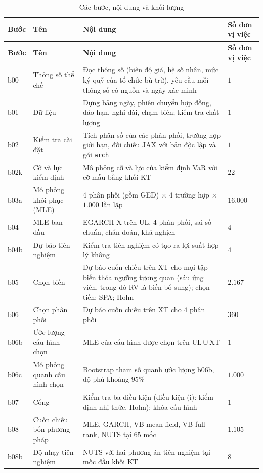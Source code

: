 \documentclass[12pt,a4paper]{article}
\theoremstyle{remark}
\newcommand{\ma}[1]{\texttt{\small #1}}
\newcommand{\UL}{\mathrm{UL}}
\newcommand{\XT}{\mathrm{XT}}
\newcommand{\KT}{\mathrm{KT}}
\begin{document}
\begin{longtable}{@{}p{1.2cm}p{4.1cm}p{5.6cm}p{3.2cm}@{}}
\caption{Các bước, nội dung và khối lượng}\label{tab:buoc}\\
\toprule
\textbf{Bước} & \textbf{Tên} & \textbf{Nội dung} & \textbf{Số đơn vị việc} \\
\midrule
\endfirsthead
\toprule
\textbf{Bước} & \textbf{Tên} & \textbf{Nội dung} & \textbf{Số đơn vị việc} \\
\midrule
\endhead
\bottomrule
\endfoot
b00 & Thông số thể chế & Đọc thông số (biên độ giá, hệ số nhân, mức ký quỹ của tổ chức bù trừ), yêu cầu mỗi thông số có nguồn và ngày xác minh & $1$ \\
b01 & Dữ liệu & Dựng bảng ngày, phiên chuyển hợp đồng, đáo hạn, nghỉ dài, chạm biên; kiểm tra chất lượng & $1$ \\
b02 & Kiểm tra cài đặt & Tích phân số của các phân phối, trường hợp giới hạn, đối chiếu JAX với bản độc lập và gói \ma{arch} & $1$ \\
b02k & Cỡ và lực kiểm định & Mô phỏng cỡ và lực của kiểm định VaR với cỡ mẫu bằng khối $\KT$ & $22$ \\
b03a & Mô phỏng khôi phục (MLE) & $4$ phân phối (gồm GED) $\times$ $4$ trường hợp $\times$ $1.000$ lần lặp & $16.000$ \\
b04 & MLE ban đầu & EGARCH-X trên $\UL$, $4$ phân phối, sai số chuẩn, chẩn đoán, khả nghịch & $4$ \\
b04b & Dự báo tiên nghiệm & Kiểm tra tiên nghiệm có tạo ra lợi suất hợp lý không & $4$ \\
b05 & Chọn biến & Dự báo cuốn chiếu trên $\XT$ cho mọi tập biến thỏa ngưỡng tương quan (sáu ứng viên, trong đó RV là biến bổ sung); chọn tiến; SPA; Holm & $2.167$ \\
b06 & Chọn phân phối & Dự báo cuốn chiếu trên $\XT$ cho $4$ phân phối & $360$ \\
b06b & Ước lượng cấu hình chọn & MLE của cấu hình được chọn trên $\UL\cup\XT$ & $1$ \\
b06c & Mô phỏng quanh cấu hình chọn & Bootstrap tham số quanh ước lượng b06b, độ phủ khoảng $95\%$ & $1.000$ \\
b07 & Cổng & Kiểm tra ba điều kiện (điều kiện (i): kiểm định nhị thức, Holm); khóa cấu hình & $1$ \\
b08 & Cuốn chiếu bốn phương pháp & MLE, GARCH, VB mean-field, VB full-rank, NUTS tại $65$ mốc & $1.105$ \\
b08b & Độ nhạy tiên nghiệm & NUTS với hai phương án tiên nghiệm tại mốc đầu khối $\KT$ & $8$ \\

\end{longtable}
\end{document}
